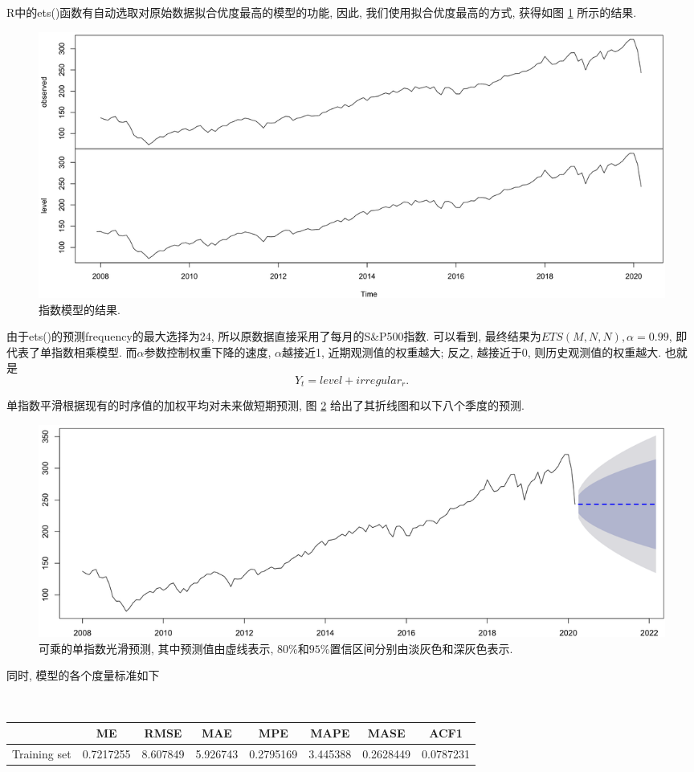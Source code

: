 \documentclass[12pt]{article}
\begin{document}
\qquad R中的ets()函数有自动选取对原始数据拟合优度最高的模型的功能, 因此, 我们使用拟合优度最高的方式, 获得如图 \ref{fig:20} 所示的结果.
\begin{figure}
    \centering
    \hspace{-30pt}\includegraphics[width=1\textwidth]{output_60_0}
    \caption{指数模型的结果.\label{fig:20}}
\end{figure}
\qquad 由于ets()的预测frequency的最大选择为24, 所以原数据直接采用了每月的S\&P500指数. 可以看到, 最终结果为$ETS(M,N,N), \alpha=0.99$, 即代表了单指数相乘模型. 而$\alpha$参数控制权重下降的速度, $\alpha$越接近1, 近期观测值的权重越大; 反之, 越接近于0, 则历史观测值的权重越大. 也就是
\[Y_t=level+irregular_r.\]

\qquad 单指数平滑根据现有的时序值的加权平均对未来做短期预测, 图 \ref{fig:21} 给出了其折线图和以下八个季度的预测. 
\begin{figure}
    \centering
    \hspace{-30pt}\includegraphics[width=.95\textwidth]{output_62_0}
    \caption{\footnotesize 可乘的单指数光滑预测, 其中预测值由虚线表示, $80\%$和$95\%$置信区间分别由淡灰色和深灰色表示.\label{fig:21}}
\end{figure}

\vspace{-10pt}\qquad 同时, 模型的各个度量标准如下

\ 

\begin{center}
\begin{tabular}{r|ccccccc}
  & ME & RMSE & MAE & MPE & MAPE & MASE & ACF1\\
\hline
	Training set & 0.7217255 & 8.607849 & 5.926743 & 0.2795169 & 3.445388 & 0.2628449 & 0.0787231\\
\end{tabular}
\normalsize
\end{center}
\end{document}
